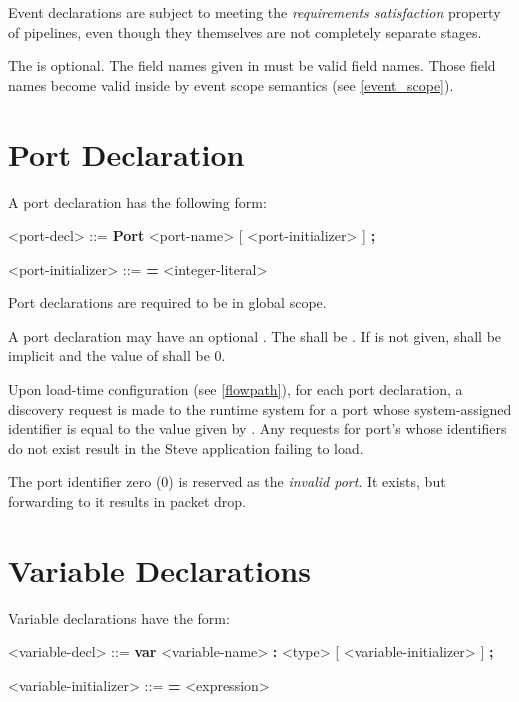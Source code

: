 Event declarations are subject to meeting the \textit{requirements satisfaction} property of pipelines, even though they themselves are not completely separate stages.

The  is optional. The field names given in  must be valid field names. Those field names become valid inside  by event scope semantics (see \ref{event_scope}).

\section{Port Declaration} \label{port_guide}

A port declaration has the following form:

\begin{minip}
\begin{grammar}
<port-decl> ::=
\textbf{Port} <port-name> [ <port-initializer> ] \textbf{;}

<port-initializer> ::= \textbf{=} <integer-literal>
\end{grammar}
\end{minip}

Port declarations are required to be in global scope.

A port declaration may have an optional . The  shall be . If  is not given,  shall be implicit and the value of  shall be 0.

Upon load-time configuration (see \ref{flowpath}), for each port declaration, a discovery request is made to the runtime system for a port whose system-assigned identifier is equal to the value given by . Any requests for port's whose identifiers do not exist result in the Steve application failing to load.

The port identifier zero (0) is reserved as the \textit{invalid port}. It exists, but forwarding to it results in packet drop.

\section{Variable Declarations} \label{variable_guide}

Variable declarations have the form:

\begin{minip}
\begin{grammar}
<variable-decl> ::=
\textbf{var} <variable-name> \textbf{:} <type> [ <variable-initializer> ] \textbf{;}

<variable-initializer> ::= \textbf{=} <expression>
\end{grammar}
\end{minip}

